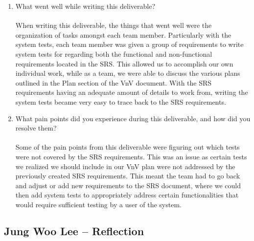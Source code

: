 \documentclass[12pt, titlepage]{article}
\begin{document}
\begin{enumerate}
  \item What went well while writing this deliverable?\\\\
  When writing this deliverable, the things that went well were the organization of tasks
  amongst each team member. Particularly with the system tests, each team member was given
  a group of requirements to write system tests for regarding both the functional and
  non-functional requirements located in the SRS. This allowed us to accomplish our own
  individual work, while as a team, we were able to discuss the various plans outlined in the
  Plan section of the VnV document. With the SRS requirements having an adequate amount of
  details to work from, writing the system tests became very easy to trace back to the SRS
  requirements.
  \item What pain points did you experience during this deliverable, and how
  did you resolve them?\\\\
  Some of the pain points from this deliverable were figuring out which tests were not
  covered by the SRS requirements. This was an issue as certain tests we realized we should
  include in our VnV plan were not addressed by the previously created SRS requirements.
  This meant the team had to go back and adjust or add new requirements to the SRS document,
  where we could then add system tests to appropriately address certain functionalities that
  would require sufficient testing by a user of the system.
\end{enumerate}

\subsection*{Jung Woo Lee -- Reflection}
\end{document}
